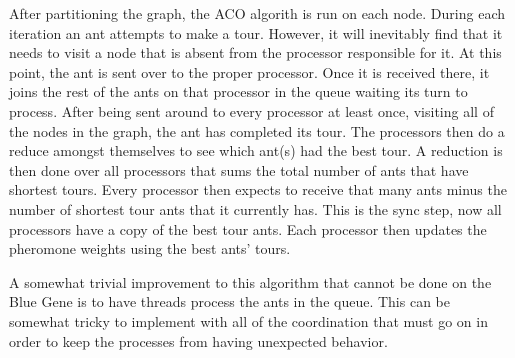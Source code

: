 \documentclass{acm_proc_article-sp}
\begin{document}
After partitioning the graph, the ACO algorith is run on each node. During each iteration an ant attempts to make a tour. 
However, it will inevitably find that it needs to visit a node that is absent from the processor responsible for it. 
At this point, the ant is sent over to the proper processor. Once it is received there, it joins the rest of the ants
on that processor in the queue waiting its turn to process. After being sent around to every processor at least once, visiting
all of the nodes in the graph, the ant has completed its tour. The processors then do a reduce amongst themselves to see which ant(s)
had the best tour. A reduction is then done over all processors that sums the total number of ants that have shortest tours.
Every processor then expects to receive that many ants minus the number of shortest tour ants that it currently has. This is the
sync step, now all processors have a copy of the best tour ants. Each processor then updates the pheromone weights using 
the best ants' tours. 

A somewhat trivial improvement to this algorithm that cannot be done on the Blue Gene is to have threads process the ants in the queue.
This can be somewhat tricky to implement with all of the coordination that must go on in order to keep the processes from having
unexpected behavior. 
\end{document}
